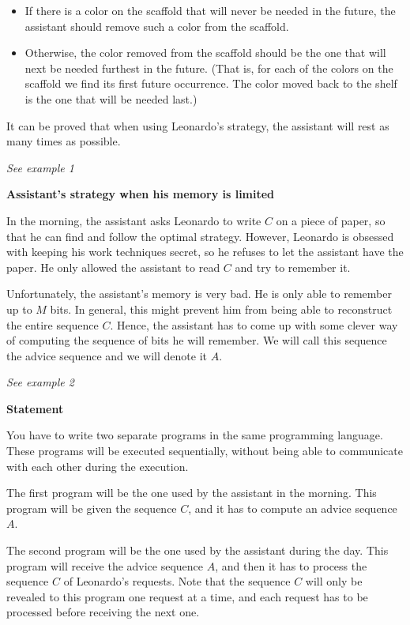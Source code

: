 \begin{itemize}

\item If there is a color on the scaffold that will never be needed in the future, the assistant should remove such a color from the scaffold.

\item Otherwise, the color removed from the scaffold should be the one that will next be needed furthest in the future. (That is, for each of the colors on the scaffold we find its first future occurrence. The color moved back to the shelf is the one that will be needed last.)

\end{itemize}

It can be proved that when using Leonardo's strategy, the assistant will rest as many times as possible.

\textit{See example 1}

\bf{Assistant's strategy when his memory is limited}

In the morning, the assistant asks Leonardo to write $C$ on a piece of paper, so that he can find and follow the optimal strategy. However, Leonardo is obsessed with keeping his work techniques secret, so he refuses to let the assistant have the paper. He only allowed the assistant to read $C$ and try to remember it.

Unfortunately, the assistant's memory is very bad. He is only able to remember up to $M$ bits. In general, this might prevent him from being able to reconstruct the entire sequence $C$. Hence, the assistant has to come up with some clever way of computing the sequence of bits he will remember. We will call this sequence the advice sequence and we will denote it $A$.

\textit{See example 2}

\bf{Statement}

You have to write two separate programs in the same programming language. These programs will be executed sequentially, without being able to communicate with each other during the execution.

The first program will be the one used by the assistant in the morning. This program will be given the sequence $C$, and it has to compute an advice sequence $A$.

The second program will be the one used by the assistant during the day. This program will receive the advice sequence $A$, and then it has to process the sequence $C$ of Leonardo's requests. Note that the sequence $C$ will only be revealed to this program one request at a time, and each request has to be processed before receiving the next one.

